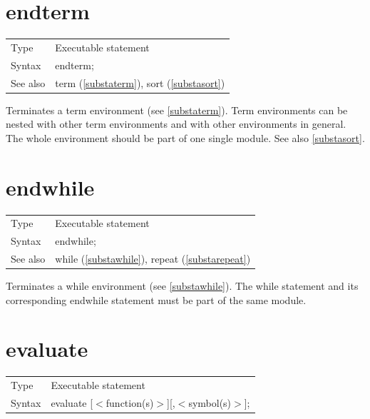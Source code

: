 \vspace{10mm}
%

\section{endterm}
\label{substaendterm}

\noindent \begin{tabular}{ll}
Type & Executable statement\\
Syntax & endterm;
\\ See also & term (\ref{substaterm}), sort (\ref{substasort})
\end{tabular} \vspace{4mm}

\noindent Terminates a term environment 
(see \ref{substaterm}). Term environments can be nested with 
other term environments and with other environments in general. The whole 
environment should be part of one single module. See also \ref{substasort}. 
\vspace{10mm}


\section{endwhile}
\label{substaendwhile}

\noindent \begin{tabular}{ll}
Type & Executable statement\\
Syntax & endwhile;
\\ See also & while (\ref{substawhile}), repeat (\ref{substarepeat})
\end{tabular} \vspace{4mm}

\noindent Terminates a while environment (see \ref{substawhile}). The while 
statement and its corresponding endwhile statement must be part of the same 
module. \vspace{10mm}

\section{evaluate}
\label{substaevaluate}

\noindent \begin{tabular}{ll}
Type & Executable statement\\
Syntax & evaluate [$<$function(s)$>$][,$<$symbol(s)$>$]; \\ 
\end{tabular} \vspace{4mm}


